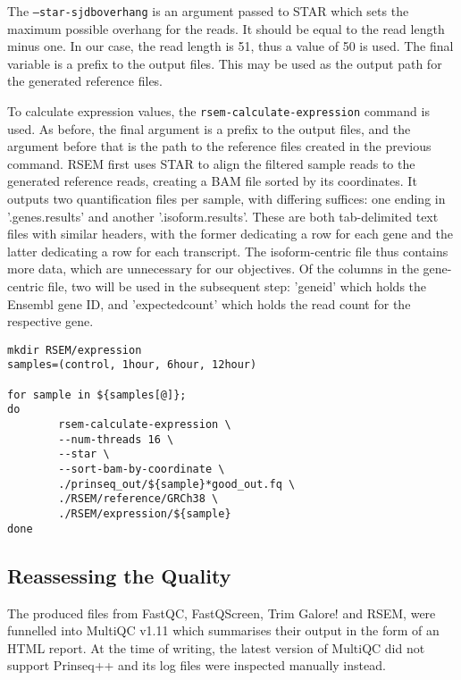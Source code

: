 The \texttt{--star-sjdboverhang} is an argument passed to \ac{STAR} which sets the maximum possible overhang for the reads. It should be equal to the read length minus one. In our case, the read length is 51, thus a value of 50 is used. The final variable is a prefix to the output files. This may be used as the output path for the generated reference files.

To calculate expression values, the \texttt{rsem-calculate-expression} command is used. As before, the final argument is a prefix to the output files, and the argument before that is the path to the reference files created in the previous command. RSEM first uses \ac{STAR} to align the filtered sample reads to the generated reference reads, creating a BAM file sorted by its coordinates. It outputs two quantification files per sample, with differing suffices: one ending in '.genes.results' and another '.isoform.results'. These are both tab-delimited text files with similar headers, with the former dedicating a row for each gene and the latter dedicating a row for each transcript. The isoform-centric file thus contains more data, which are unnecessary for our objectives. Of the columns in the gene-centric file, two will be used in the subsequent step: 'gene\textunderscore id' which holds the Ensembl gene ID, and 'expected\textunderscore count' which holds the read count for the respective gene. %

\begin{lstlisting}[caption=RSEM expression command, label={lst:RSEM_exp}]
mkdir RSEM/expression
samples=(control, 1hour, 6hour, 12hour)

for sample in ${samples[@]};
do
        rsem-calculate-expression \
        --num-threads 16 \
        --star \
        --sort-bam-by-coordinate \
        ./prinseq_out/${sample}*good_out.fq \
        ./RSEM/reference/GRCh38 \
        ./RSEM/expression/${sample}
done
\end{lstlisting}

\subsection{Reassessing the Quality}

The produced files from FastQC, FastQScreen, Trim Galore! and RSEM, were funnelled into MultiQC v1.11 \citep{multiqc} which summarises their output in the form of an HTML report. At the time of writing, the latest version of MultiQC did not support Prinseq++ and its log files were inspected manually instead.

